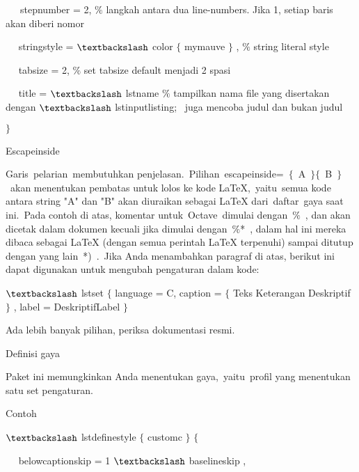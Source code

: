 ~~~stepnumber = 2, $\%$ langkah antara dua line-numbers.  Jika 1, setiap baris akan diberi nomor\par

~~ stringstyle = $\textbackslash$ color $ \{ $ mymauve $ \} $ , $\%$ string literal style\par

~~ tabsize = 2, $\%$ set tabsize default menjadi 2 spasi\par

~~ title = $\textbackslash$ lstname $\%$ tampilkan nama file yang disertakan dengan $\textbackslash$ lstinputlisting;~ juga mencoba judul dan bukan judul\par

 $ \} $\par

Escapeinside\par

Garis pelarian membutuhkan penjelasan. Pilihan escapeinside= $ \{ $ A $ \} $$ \{ $ B $ \} $ akan menentukan pembatas untuk lolos ke kode LaTeX, yaitu semua kode antara string "A" dan "B" akan diuraikan sebagai LaTeX dari daftar gaya saat ini. Pada contoh di atas, komentar untuk Octave dimulai dengan $\%$ , dan akan dicetak dalam dokumen kecuali jika dimulai dengan $\%$* , dalam hal ini mereka dibaca sebagai LaTeX (dengan semua perintah LaTeX terpenuhi) sampai ditutup dengan yang lain *) . Jika Anda menambahkan paragraf di atas, berikut ini dapat digunakan untuk mengubah pengaturan dalam kode:\par

$\textbackslash$ lstset $ \{ $ language = C, caption = $ \{ $ Teks Keterangan Deskriptif $ \} $ , label = DeskriptifLabel $ \} $\par

Ada lebih banyak pilihan, periksa dokumentasi resmi.\par

Definisi gaya \par

Paket ini memungkinkan Anda menentukan gaya, yaitu profil yang menentukan satu set pengaturan.\par

Contoh\par

 $\textbackslash$ lstdefinestyle $ \{ $ customc $ \} $ $ \{ $\par

~~ belowcaptionskip = 1 $\textbackslash$ baselineskip ,\par

